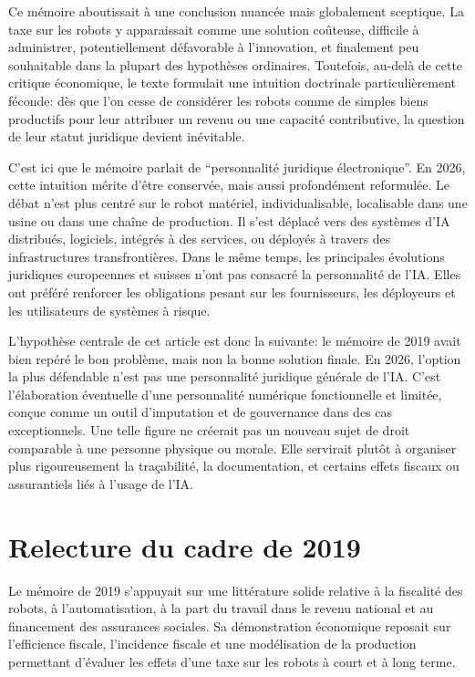 \documentclass[11pt]{article}
\begin{document}
Ce mémoire aboutissait à une conclusion nuancée mais globalement sceptique. La taxe sur les robots y apparaissait comme une solution coûteuse, difficile à administrer, potentiellement défavorable à l'innovation, et finalement peu souhaitable dans la plupart des hypothèses ordinaires. Toutefois, au-delà de cette critique économique, le texte formulait une intuition doctrinale particulièrement féconde: dès que l'on cesse de considérer les robots comme de simples biens productifs pour leur attribuer un revenu ou une capacité contributive, la question de leur statut juridique devient inévitable.

C'est ici que le mémoire parlait de ``personnalité juridique électronique''. En 2026, cette intuition mérite d'être conservée, mais aussi profondément reformulée. Le débat n'est plus centré sur le robot matériel, individualisable, localisable dans une usine ou dans une chaîne de production. Il s'est déplacé vers des systèmes d'IA distribués, logiciels, intégrés à des services, ou déployés à travers des infrastructures transfrontières. Dans le même temps, les principales évolutions juridiques europeennes et suisses n'ont pas consacré la personnalité de l'IA. Elles ont préféré renforcer les obligations pesant sur les fournisseurs, les déployeurs et les utilisateurs de systèmes à risque.

L'hypothèse centrale de cet article est donc la suivante: le mémoire de 2019 avait bien repéré le bon problème, mais non la bonne solution finale. En 2026, l'option la plus défendable n'est pas une personnalité juridique générale de l'IA. C'est l'élaboration éventuelle d'une personnalité numérique fonctionnelle et limitée, conçue comme un outil d'imputation et de gouvernance dans des cas exceptionnels. Une telle figure ne créerait pas un nouveau sujet de droit comparable à une personne physique ou morale. Elle servirait plutôt à organiser plus rigoureusement la traçabilité, la documentation, et certains effets fiscaux ou assurantiels liés à l'usage de l'IA.

\section{Relecture du cadre de 2019}
Le mémoire de 2019 s'appuyait sur une littérature solide relative à la fiscalité des robots, à l'automatisation, à la part du travail dans le revenu national et au financement des assurances sociales. Sa démonstration économique reposait sur l'efficience fiscale, l'incidence fiscale et une modélisation de la production permettant d'évaluer les effets d'une taxe sur les robots à court et à long terme.
\end{document}
